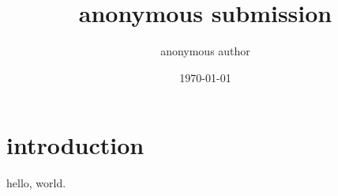 \documentclass{article}
\title{anonymous submission}
\author{anonymous author}
\date{\today}
\begin{document}
\maketitle
\section{introduction}
hello, world\cite{greenwade93}.



\end{document}
